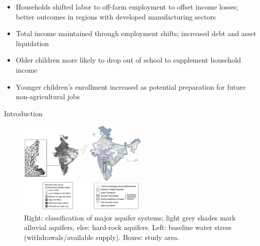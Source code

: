 \documentclass[10pt]{beamer}
\begin{document}
\begin{frame}
\begin{itemize}
\begin{itemize}
			      \item Households shifted labor to off-farm employment to offset income losses; better outcomes in regions with developed manufacturing sectors
			      \item Total income maintained through employment shifts; increased debt and asset liquidation
			      \item Older children more likely to drop out of school to supplement household income
			      \item Younger children's enrollment increased as potential preparation for future non-agricultural jobs
		      \end{itemize}
	\end{itemize}
\end{frame}

\begin{frame}
	{Introduction}
	\begin{figure}
		\centering
		\includegraphics[width=0.55\textwidth]{figure1.png}
		\caption{Right: classification of major aquifer systems; light grey shades mark alluvial aquifers, else: hard-rock aquifers. Left: baseline water stress (withdrawals/available supply). Boxes: study area.}
	\end{figure}
\end{frame}

\end{document}
